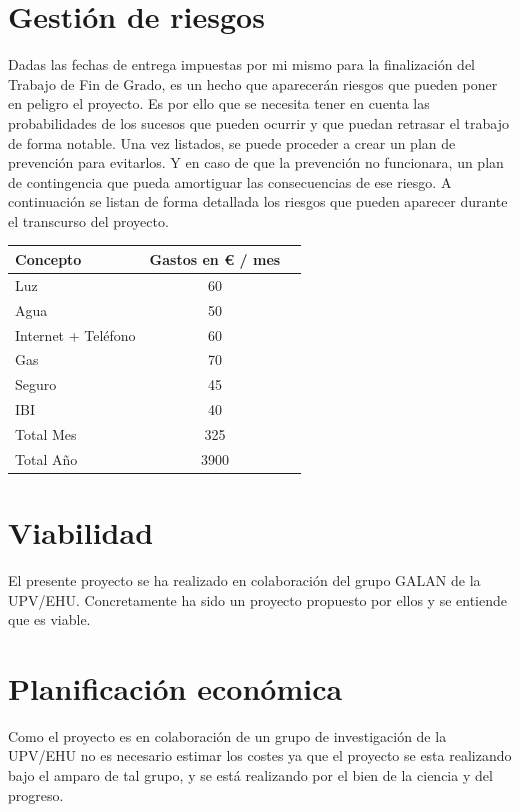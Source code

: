 \section{Gesti\'{o}n de riesgos}
Dadas las fechas de entrega impuestas por mi mismo para la finalizaci\'{o}n del Trabajo de Fin de Grado, es un hecho que
aparecerán riesgos que pueden poner en peligro el proyecto. Es por ello que se necesita tener en cuenta las probabilidades de los sucesos que 
pueden ocurrir y que puedan retrasar el trabajo de forma notable. Una vez
listados, se puede proceder a crear un plan de prevención para evitarlos. Y en caso de que la prevención no
funcionara, un plan de contingencia que pueda amortiguar las consecuencias de ese riesgo. A continuación
se listan de forma detallada los riesgos que pueden aparecer durante el transcurso del proyecto.

\begin{tabular}{l*{1}{c}r}
    Concepto                   & Gastos en € / mes & \\
    \hline
    Luz                        & 60 & \\
    Agua                       & 50 & \\
    Internet + Teléfono        & 60 & \\
    Gas                        & 70 & \\
    Seguro                     & 45 & \\
    IBI                        & 40 & \\
    \hline
    Total Mes                  & 325 & \\
    Total A\~{n}o              & 3900 &\\
\end{tabular}

\section{Viabilidad}
El presente proyecto se ha realizado en colaboraci\'{o}n del grupo GALAN de la UPV/EHU. Concretamente ha sido un proyecto propuesto por ellos
y se entiende que es viable.

\section{Planificaci\'{o}n econ\'{o}mica}
Como el proyecto es en colaboraci\'{o}n de un grupo de investigaci\'{o}n de la UPV/EHU no es necesario estimar los costes ya que
el proyecto se esta realizando bajo el amparo de tal grupo, y se est\'{a} realizando por el bien de la ciencia y del progreso.

